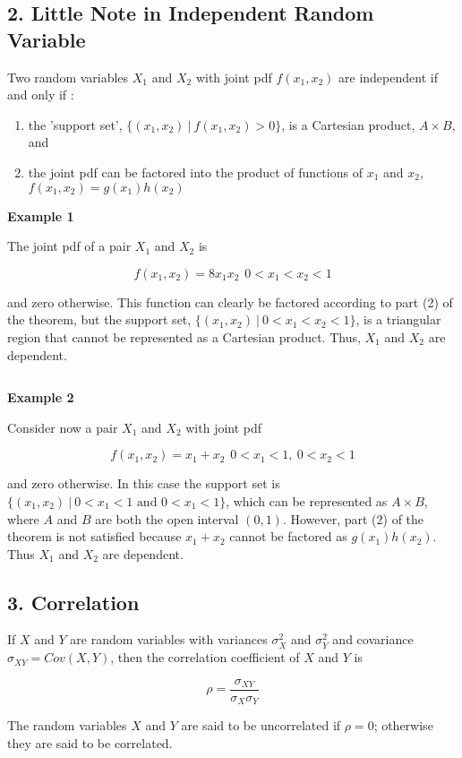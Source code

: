 \subsection*{2. Little Note in Independent Random Variable}

\begin{thm*}
	Two random variables $X_1$ and $X_2$ with joint pdf $f(x_1,x_2)$ are independent if and only if :
	
	\begin{enumerate}
		\item the 'support set', $\{(x_1,x_2)~|~ f(x_1,x_2) > 0\}$, is a Cartesian product, $A \times B$, and
		\item the joint pdf can be factored into the product of functions of $x_1$ and $x_2$, $f(x_1,x_2) = g(x_1)h(x_2)$
	\end{enumerate}
\end{thm*}

\textbf{Example 1}

The joint pdf of a pair $X_1$ and $X_2$ is 

$$f(x_1,x_2) = 8x_1x_2 \hspace{5pt} 0 < x_1 < x_2 < 1$$

and zero otherwise. This function can clearly be factored according to part (2) of the theorem, but the support set, $\{(x_1,x_2) ~|~ 0 < x_1 < x_2 < 1\}$, is a triangular region that cannot be represented as a Cartesian product. Thus, $X_1$ and $X_2$ are dependent.

$ $ 

\textbf{Example 2}

Consider now a pair $X_1$ and $X_2$ with joint pdf

$$f(x_1,x_2) = x_1 + x_2 \hspace{5pt} 0 < x_1 < 1,~0 < x_2 < 1$$

and zero otherwise. In this case the support set is $\{(x_1,x_2)~|~ 0 < x_1 < 1 \text{ and } 0 < x_1 < 1\}$, which can be represented as $A \times B$, where $A$ and $B$ are both the open interval $(0,1)$. However, part (2) of the theorem is not satisfied because $x_1 + x_2$ cannot be factored as $g(x_1)h(x_2)$. Thus $X_1$ and $X_2$ are dependent.


\newpage

\subsection*{3. Correlation}

\begin{defn}
	If $X$ and $Y$ are random variables with variances $\sigma^2_X$ and $\sigma^2_Y$ and covariance $\sigma_{XY} = Cov(X,Y)$, then the correlation coefficient of $X$ and $Y$ is 
	
	$$\rho = \dfrac{\sigma_{XY}}{\sigma_X\sigma_Y} $$
	
	The random variables $X$ and $Y$ are said to be uncorrelated if $\rho = 0$; otherwise they are said to be correlated.
\end{defn}

